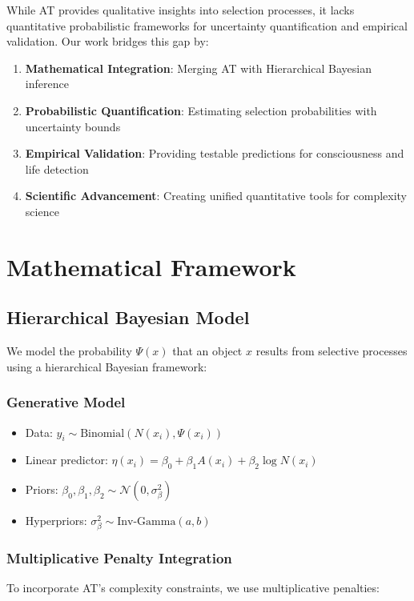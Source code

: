 \documentclass[11pt,a4paper]{article}
\begin{document}
While AT provides qualitative insights into selection processes, it lacks quantitative probabilistic frameworks for uncertainty quantification and empirical validation. Our work bridges this gap by:

\begin{enumerate}
    \item \textbf{Mathematical Integration}: Merging AT with Hierarchical Bayesian inference
    \item \textbf{Probabilistic Quantification}: Estimating selection probabilities with uncertainty bounds
    \item \textbf{Empirical Validation}: Providing testable predictions for consciousness and life detection
    \item \textbf{Scientific Advancement}: Creating unified quantitative tools for complexity science
\end{enumerate}

\section{Mathematical Framework}
\label{sec:mathematical}

\subsection{Hierarchical Bayesian Model}
\label{subsec:hb_model}

We model the probability \( \Psi(x) \) that an object \( x \) results from selective processes using a hierarchical Bayesian framework:

\subsubsection{Generative Model}
\begin{itemize}
    \item Data: \( y_i \sim \text{Binomial}(N(x_i), \Psi(x_i)) \)
    \item Linear predictor: \( \eta(x_i) = \beta_0 + \beta_1 A(x_i) + \beta_2 \log N(x_i) \)
    \item Priors: \( \beta_0, \beta_1, \beta_2 \sim \mathcal{N}(0, \sigma_\beta^2) \)
    \item Hyperpriors: \( \sigma_\beta^2 \sim \text{Inv-Gamma}(a, b) \)
\end{itemize}

\subsubsection{Multiplicative Penalty Integration}
To incorporate AT's complexity constraints, we use multiplicative penalties:
\end{document}
